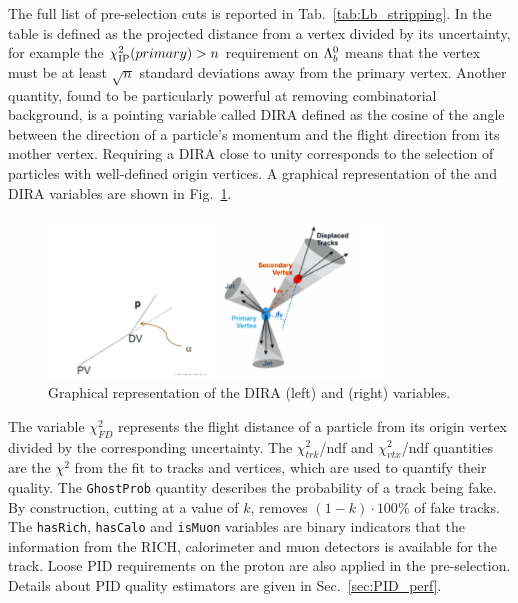 The full list of pre-selection cuts is reported in Tab.~\ref{tab:Lb_stripping}.
In the table \chisqip is defined as the projected distance from a vertex
divided by its uncertainty, for example the $\chi^2_{\rm IP}(primary) > n$ requirement on ${{\Lambda}^0_{b}}$ means
that the \Lb vertex must be at least $\sqrt{n}$ standard deviations away from the primary vertex.
Another quantity, found to be particularly powerful at removing combinatorial background, is a pointing variable called DIRA
defined as the cosine of the angle between the direction of a particle's momentum and
the flight direction from its mother vertex. Requiring a DIRA close to unity corresponds to 
the selection of particles with well-defined origin vertices.
A graphical representation of the \chisqip and DIRA variables are shown in Fig.~\ref{fig:IPandDIRA}.
%
\begin{figure}[hb]
\centering
\includegraphics[width=0.8\textwidth]{Lmumu/figs/IPandDIRA.png}
\caption{Graphical representation of the DIRA (left) and \chisqip (right) variables.}
\label{fig:IPandDIRA}
\end{figure}
%
The variable $\chi^2_{FD}$ represents the flight distance of a particle from its origin vertex
divided by the corresponding uncertainty. The $\chi^2_{trk}$/ndf and $\chi^2_{vtx}$/ndf quantities are the $\chi^2$ 
from the fit to tracks and vertices, which are used to quantify their quality.
The \verb!GhostProb! quantity describes the probability of a track being fake.
By construction, cutting at a value of $k$, removes $(1 - k)\cdot 100 \%$ of fake tracks.
The \verb!hasRich!, \verb!hasCalo! and \verb!isMuon! variables are binary indicators that
the information from the RICH, calorimeter and muon detectors is available for the track.
Loose PID requirements on the proton are also applied in the pre-selection.
Details about PID quality estimators are given in Sec.~\ref{sec:PID_perf}.
